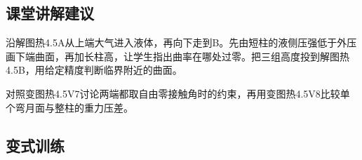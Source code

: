 \documentclass[UTF8,fontset=fandol,a4paper,11pt]{ctexart}
\begin{document}
\subsection*{课堂讲解建议}

沿解图热4.5A从上端大气进入液体，再向下走到B。先由短柱的液侧压强低于外压画下端曲面，再加长柱高，让学生指出曲率在哪处过零。把三组高度投到解图热4.5B，用给定精度判断临界附近的曲面。

对照变图热4.5V7讨论两端都取自由零接触角时的约束，再用变图热4.5V8比较单个弯月面与整柱的重力压差。



\subsection*{变式训练}
\end{document}
